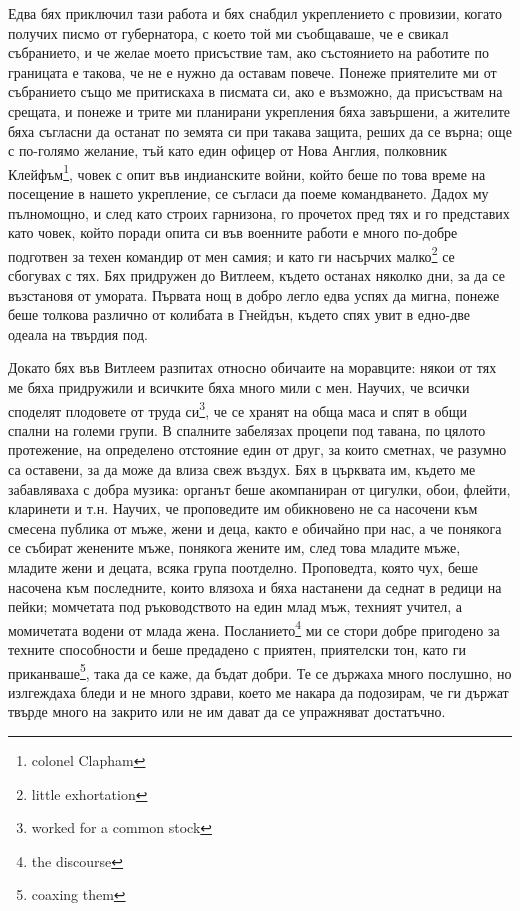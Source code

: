 \documentclass[12pt]{book}
\begin{document}
Едва бях приключил тази работа и бях снабдил укреплението с провизии, когато получих писмо от губернатора, с което той ми съобщаваше, че е свикал събранието, и че желае моето присъствие там, ако състоянието на работите по границата е такова, че не е нужно да оставам повече. Понеже приятелите ми от събранието също ме притискаха в писмата си, ако е възможно, да присъствам на срещата, и понеже и трите ми планирани укрепления бяха завършени, а жителите бяха съгласни да останат по земята си при такава защита, реших да се върна; още с по-голямо желание, тъй като един офицер от Нова Англия, полковник Клейфъм\footnote{colonel Clapham}, човек с опит във индианските войни, който беше по това време на посещение в нашето укрепление, се съгласи да поеме командването. Дадох му пълномощно, и след като строих гарнизона, го прочетох пред тях и го представих като човек, който поради опита си във военните работи е много по-добре подготвен за техен командир от мен самия; и като ги насърчих малко\footnote{little exhortation} се сбогувах с тях. Бях придружен до Витлеем, където останах няколко дни, за да се възстановя от умората. Първата нощ в добро легло едва успях да мигна, понеже беше толкова различно от колибата в Гнейдън, където спях увит в едно-две одеала на твърдия под.

Докато бях във Витлеем разпитах относно обичаите на моравците: някои от тях ме бяха придружили и всичките бяха много мили с мен. Научих, че всички споделят плодовете от труда си\footnote{worked for a common stock}, че се хранят на обща маса и спят в общи спални на големи групи. В спалните забелязах процепи под тавана, по цялото протежение, на определено отстояние един от друг, за които сметнах, че разумно са оставени, за да може да влиза свеж въздух. Бях в църквата им, където ме забавляваха с добра музика: органът беше акомпаниран от цигулки, обои, флейти, кларинети и т.н. Научих, че проповедите им обикновено не са насочени към смесена публика от мъже, жени и деца, както е обичайно при нас, а че понякога се събират женените мъже, понякога жените им, след това младите мъже, младите жени и децата, всяка група поотделно. Проповедта, която чух, беше насочена към последните, които влязоха и бяха настанени да седнат в редици на пейки; момчетата под ръководството на един млад мъж, техният учител, а момичетата водени от млада жена. Посланието\footnote{the discourse} ми се стори добре пригодено за техните способности и беше предадено с приятен, приятелски тон, като ги приканваше\footnote{coaxing them}, така да се каже, да бъдат добри. Те се държаха много послушно, но излгеждаха бледи и не много здрави, което ме накара да подозирам, че ги държат твърде много на закрито или не им дават да се упражняват достатъчно.
\end{document}
